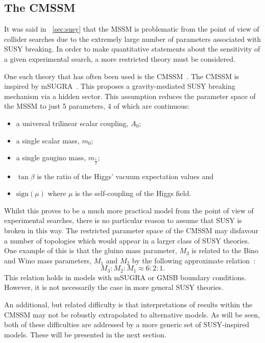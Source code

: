 \subsection{The \acl{CMSSM}}
\label{sec:cmssm}
It was said in \chap~\ref{sec:susy} that the \ac{MSSM} is problematic from the
point of view of collider searches due to the extremely large number of
parameters associated with \ac{SUSY} breaking. In order to make quantitative
statements about the sensitivity of a given experimental search, a more
restricted theory must be considered.

One such theory that has often been used is the
\ac{CMSSM}~\cite{sparticles}. The \ac{CMSSM} is inspired by
\ac{mSUGRA}~\cite{kane_minimal}. This proposes a gravity-mediated \ac{SUSY}
breaking mechanism via a hidden sector. This assumption reduces the parameter
space of the \ac{MSSM} to just 5 parameters, 4 of which are continuous:
\begin{itemize}
\item a universal trilinear scalar coupling, $A_0$;
\item a single scalar mass, $m_0$;
\item a single gaugino mass, $m_{\frac{1}{2}}$;
\item $\tan\beta$ is the ratio of the Higgs' vacuum expectation values and
\item $\textrm{sign}(\mu)$ where $\mu$ is the self-coupling of the Higgs field.
\end{itemize}

Whilst this proves to be a much more practical model from the point of view of
experimental searches, there is no particular reason to assume that \ac{SUSY} is
broken in this way. The restricted parameter space of the \ac{CMSSM} may
disfavour a number of topologies which would appear in a larger class of
\ac{SUSY} theories. One example of this is that the gluino mass parameter, $M_3$
is related to the Bino and Wino mass parameters, $M_1$ and $M_2$ by the
following approximate relation~\cite[p.99]{susy_primer}:
\begin{equation*}
M_3:M_2:M_1 \approx 6:2:1.
\end{equation*}
This relation holds in models with \ac{mSUGRA} or \ac{GMSB} boundary
conditions. However, it is not necessarily the case in more general \ac{SUSY}
theories.

An additional, but related difficulty is that
interpretations of results within the \ac{CMSSM} may not be robustly
extrapolated to alternative models. As will be seen, both of these difficulties
are addressed by a more generic set of \ac{SUSY}-inspired models. These will be
presented in the next section.

